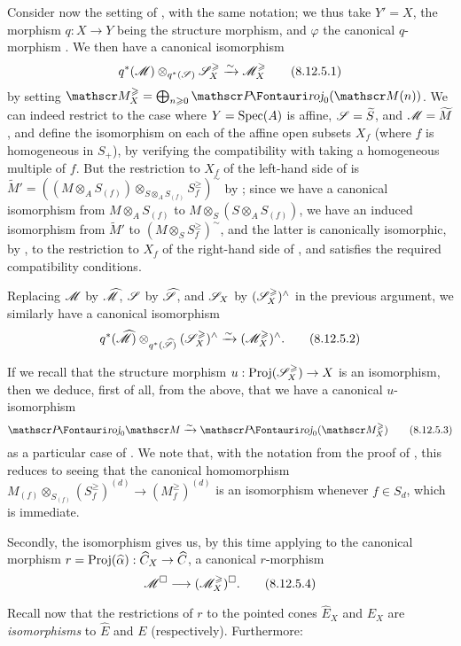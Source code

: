 \begin{env}[8.12.5]
\label{II.8.12.5}
Consider now the setting of , with the same notation;
we thus take $Y'=X$, the morphism $q:X\to Y$ being the structure morphism, and $\varphi$ the canonical $q$-morphism .
We then have a canonical isomorphism
\[
\label{II.8.12.5.1}
    q^*(\mathscr{M})\otimes_{q^*(\mathscr{S})}\mathscr{S}_X^\geqslant \xrightarrow{\sim} \mathscr{M}_X^\geqslant
\tag{8.12.5.1}
\]
by setting $\sh{M}_X^\geq=\bigoplus_{n\geq0}\shProj_0(\sh{M}(n))$.
We can indeed restrict to the case where $Y=\operatorname{Spec}(A)$ is affine, $\mathscr{S}=\widetilde{S}$, and $\mathscr{M}=\widetilde{M}$, and define the isomorphism  on each of the affine open subsets $X_f$ (where $f$ is homogeneous in $S_+$), by verifying the compatibility with taking a homogeneous multiple of $f$.
But the restriction to $X_f$ of the left-hand side of  is $\widetilde{M}'=((M\otimes_A S_{(f)})\otimes_{S\otimes_A S_{(f)}}S_f^\geq)^\sim$ by ;
since we have a canonical isomorphism from $M\otimes_A S_{(f)}$ to $M\otimes_S(S\otimes_A S_{(f)})$, we have an induced isomorphism from $\widetilde{M}'$ to $(M\otimes_S S_f^\geq)^\sim$, and the latter is canonically isomorphic, by , to the restriction to $X_f$ of the right-hand side of , and satisfies the required compatibility conditions.

Replacing $\mathscr{M}$ by $\widehat{\mathscr{M}}$, $\mathscr{S}$ by $\widehat{\mathscr{S}}$, and $\mathscr{S}_X$ by $(\mathscr{S}_X^\geqslant)^\wedge$ in the previous argument, we similarly have a canonical isomorphism
\[
\label{II.8.12.5.2}
    q^*(\widehat{\mathscr{M}})\otimes_{q^*(\widehat{\mathscr{S}})}(\mathscr{S}_X^\geqslant)^\wedge \xrightarrow{\sim} (\mathscr{M}_X^\geqslant)^\wedge.
\tag{8.12.5.2}
\]

If we recall  that the structure morphism $u:\Proj(\sh{S}_X^\geq)\to X$ is an isomorphism, then we deduce, first of all, from the above, that we have a canonical $u$-isomorphism
\[
\label{II.8.12.5.3}
    \shProj_0\sh{M} \xrightarrow{\sim} \shProj_0(\sh{M}_X^\geq)
\tag{8.12.5.3}
\]
as a particular case of .
We note that, with the notation from the proof of , this reduces to seeing that the canonical homomorphism $M_{(f)}\otimes_{S_{(f)}}(S_f^\geq)^{(d)}\to(M_f^\geq)^{(d)}$ is an isomorphism whenever $f\in S_d$, which is immediate.

Secondly, the isomorphism  gives us, by this time applying  to the canonical morphism $r=\Proj(\widehat{\alpha}):\widehat{C}_X\to\widehat{C}$, a canonical $r$-morphism
\[
\label{II.8.12.5.4}
    \sh{M}^\square \to (\sh{M}_X^\geq)^\square.
\tag{8.12.5.4}
\]

Recall now  that the restrictions of $r$ to the pointed cones $\widehat{E}_X$ and $E_X$ are \emph{isomorphisms} to $\widehat{E}$ and $E$ (respectively).
Furthermore:
\end{env}

